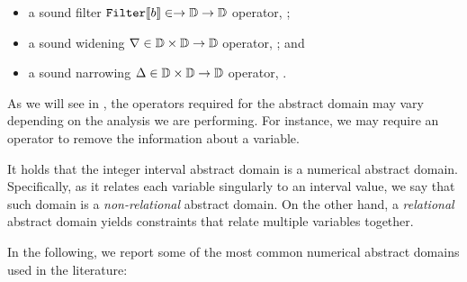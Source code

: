 \begin{definition}
\begin{itemize}
    \item a sound filter $\textup{\texttt{Filter}}\llbracket b \rrbracket\in\to\mathbb{D}\to\mathbb{D}$ operator, \cf{} ;
    \item a sound widening $\nabla\in\mathbb{D}\times\mathbb{D}\to\mathbb{D}$ operator, \cf{} ; and
    \item a sound narrowing $\Delta\in\mathbb{D}\times\mathbb{D}\to\mathbb{D}$ operator, \cf{} .
  \end{itemize}
\end{definition}

As we will see in , the operators required for the abstract domain may vary depending on the analysis we are performing. For instance, we may require an operator to remove the information about a variable.

\begin{remark}
  It holds that the integer interval abstract domain is a numerical abstract domain.
  Specifically, as it relates each variable singularly to an interval value, we say that such domain is a \emph{non-relational} abstract domain.
  On the other hand, a \emph{relational} abstract domain yields constraints that relate multiple variables together.
\end{remark}


In the following, we report some of the most common numerical abstract domains used in the literature:

